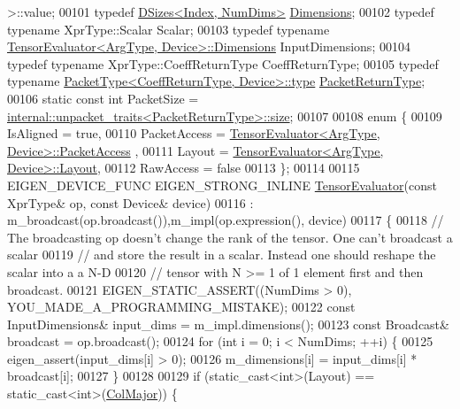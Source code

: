 \begin{DoxyCode}
      >::value;
00101   \textcolor{keyword}{typedef} \hyperlink{struct_eigen_1_1_d_sizes}{DSizes<Index, NumDims>} \hyperlink{struct_eigen_1_1_d_sizes}{Dimensions};
00102   \textcolor{keyword}{typedef} \textcolor{keyword}{typename} XprType::Scalar Scalar;
00103   \textcolor{keyword}{typedef} \textcolor{keyword}{typename} \hyperlink{struct_eigen_1_1_tensor_evaluator}{TensorEvaluator<ArgType, Device>::Dimensions}
       InputDimensions;
00104   \textcolor{keyword}{typedef} \textcolor{keyword}{typename} XprType::CoeffReturnType CoeffReturnType;
00105   \textcolor{keyword}{typedef} \textcolor{keyword}{typename} \hyperlink{group___sparse_core___module}{PacketType<CoeffReturnType, Device>::type} 
      \hyperlink{group___sparse_core___module}{PacketReturnType};
00106   \textcolor{keyword}{static} \textcolor{keyword}{const} \textcolor{keywordtype}{int} PacketSize = 
      \hyperlink{struct_eigen_1_1internal_1_1unpacket__traits}{internal::unpacket\_traits<PacketReturnType>::size};
00107 
00108   \textcolor{keyword}{enum} \{
00109     IsAligned = \textcolor{keyword}{true},
00110     PacketAccess = \hyperlink{struct_eigen_1_1_tensor_evaluator}{TensorEvaluator<ArgType, Device>::PacketAccess}
      ,
00111     Layout = \hyperlink{struct_eigen_1_1_tensor_evaluator}{TensorEvaluator<ArgType, Device>::Layout},
00112     RawAccess = \textcolor{keyword}{false}
00113   \};
00114 
00115   EIGEN\_DEVICE\_FUNC EIGEN\_STRONG\_INLINE \hyperlink{struct_eigen_1_1_tensor_evaluator}{TensorEvaluator}(\textcolor{keyword}{const} XprType& op, \textcolor{keyword}{const} Device& 
      device)
00116     : m\_broadcast(op.broadcast()),m\_impl(op.expression(), device)
00117   \{
00118     \textcolor{comment}{// The broadcasting op doesn't change the rank of the tensor. One can't broadcast a scalar}
00119     \textcolor{comment}{// and store the result in a scalar. Instead one should reshape the scalar into a a N-D}
00120     \textcolor{comment}{// tensor with N >= 1 of 1 element first and then broadcast.}
00121     EIGEN\_STATIC\_ASSERT((NumDims > 0), YOU\_MADE\_A\_PROGRAMMING\_MISTAKE);
00122     \textcolor{keyword}{const} InputDimensions& input\_dims = m\_impl.dimensions();
00123     \textcolor{keyword}{const} Broadcast& broadcast = op.broadcast();
00124     \textcolor{keywordflow}{for} (\textcolor{keywordtype}{int} i = 0; i < NumDims; ++i) \{
00125       eigen\_assert(input\_dims[i] > 0);
00126       m\_dimensions[i] = input\_dims[i] * broadcast[i];
00127     \}
00128 
00129     \textcolor{keywordflow}{if} (static\_cast<int>(Layout) == static\_cast<int>(\hyperlink{group__enums_ggaacded1a18ae58b0f554751f6cdf9eb13a0cbd4bdd0abcfc0224c5fcb5e4f6669a}{ColMajor})) \{

\end{DoxyCode}
